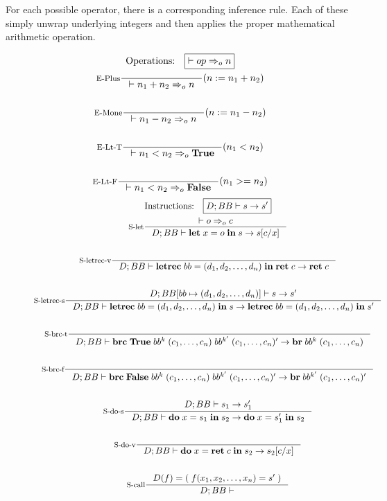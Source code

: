 \documentclass[a4paper, oneside, 10pt, draft]{memoir}
\begin{document}
For each possible operator, there is a corresponding inference
rule. Each of these simply unwrap underlying integers and then applies
the proper mathematical arithmetic operation.
\newcommand{\meval}{:=}
\newcommand{\dbundle}{(d_1, d_2, \dotsc, d_n)}
\begin{figure}
  \begin{gather*}
    \text{Operations:} \quad \boxed{|- op \eop n}\\
    \inference[E-Plus]{}{|- n_1 + n_2 \eop n}(n \meval n_1 + n_2)\\\\
    \inference[E-Mone]{}{|- n_1 - n_2 \eop n}(n \meval n_1 - n_2)\\\\
    \inference[E-Lt-T]{}{|- n_1  < n_2 \eop \btrue}(n_1 < n_2)\\\\
    \inference[E-Lt-F]{}{|- n_1  < n_2 \eop \bfalse}(n_1 >= n_2)
  \end{gather*}
  \begin{gather*}
    \text{Instructions:} \quad \boxed{D;BB |- s -> s'}\\
    \inference[S-let]{|- o \eop c}{D;BB |- \ilet{x}{o}{s} -> s[c/x]}\\\\
    \inference[S-letrec-v]{}{D;BB |- \iletrec{bb}{\dbundle}
      {\iret{c}} -> \iret{c}}\\\\
    \inference[S-letrec-s]{D;BB[bb \mapsto \dbundle] |- s -> s'}
    {D;BB |- \iletrec{bb}{\dbundle}{s} -> \iletrec{bb}{\dbundle}{s'}}\\\\
    \inference[S-brc-t]{}{D;BB |-
      \ibrc{\btrue}{bb^k}{(c_1, \dotsc, c_n)}{bb^{k'}}{(c_1, \dotsc, c_n)'} -> \ibr{bb^k}{(c_1, \dotsc, c_n)}}\\\\
    \inference[S-brc-f]{}{D;BB |-
      \ibrc{\bfalse}{bb^k}{(c_1, \dotsc, c_n)}{bb^{k'}}{(c_1, \dotsc, c_n)'} ->
      \ibr{bb^{k'}}{(c_1, \dotsc, c_n)'}}\\\\
    \inference[S-do-s]{D;BB |- s_1 -> s'_1}{D;BB |-
      \ido{x}{s_1}{s_2} -> \ido{x}{s'_1}{s_2}}\\\\
    \inference[S-do-v]{}{D;BB |- \ido{x}{\iret{c}}{s_2} -> s_2[c/x]}\\\\
    \inference[S-call]{D(f) = (\;f(x_1, x_2, \dotsc, x_n) = s'\;)}{D;BB |-
}
\end{gather*}
\end{figure}
\end{document}
